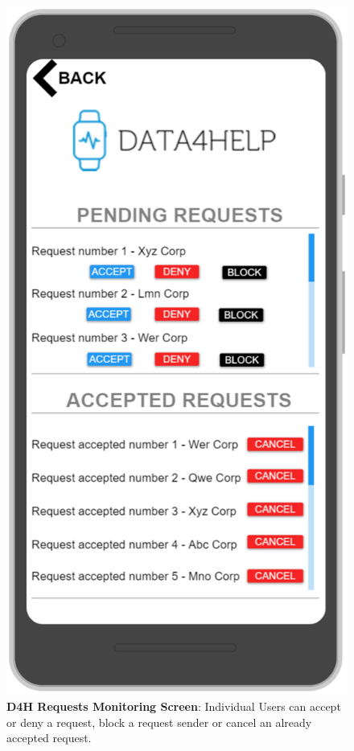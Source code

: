 \begin{figure}[H]
\centering
\includegraphics[scale = 0.5]{Mocks/Mobile_D4H_Requests.PNG}
\caption{\textbf{D4H Requests Monitoring Screen}: Individual Users can accept or deny a request, block a request sender or cancel an already accepted request.}
\end{figure}

